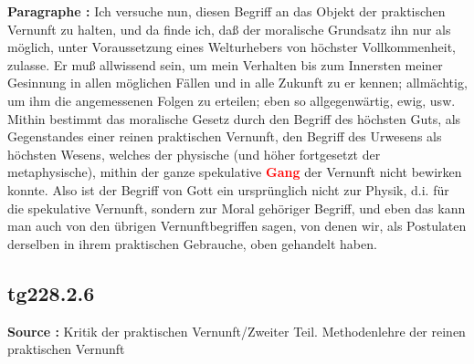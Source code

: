 \documentclass[a4paper,12pt,twoside]{book}
\newcommand{\match}[1]{\textcolor{red}{\textbf{#1}}}
\begin{document}
	\noindent\textbf{Paragraphe : }Ich versuche nun, diesen Begriff an das Objekt der praktischen Vernunft zu halten, und da finde ich, daß der moralische Grundsatz ihn nur als möglich, unter Voraussetzung eines Welturhebers von höchster Vollkommenheit, zulasse. Er muß allwissend sein, um mein Verhalten bis zum Innersten meiner Gesinnung in allen möglichen Fällen und in alle Zukunft zu er kennen; allmächtig, um ihm die angemessenen Folgen zu erteilen; eben so allgegenwärtig, ewig, usw. Mithin bestimmt das moralische Gesetz durch den Begriff des höchsten Guts, als Gegenstandes einer reinen praktischen Vernunft, den Begriff des Urwesens als höchsten Wesens, welches der physische (und höher fortgesetzt der metaphysische), mithin der ganze spekulative  \match{Gang} der Vernunft nicht bewirken konnte. Also ist der Begriff von Gott ein ursprünglich nicht zur Physik, d.i. für die spekulative Vernunft, sondern zur Moral gehöriger Begriff, und eben das kann man auch von den übrigen Vernunftbegriffen sagen, von denen wir, als Postulaten derselben in ihrem praktischen Gebrauche, oben gehandelt haben. 
	
	\subsection*{tg228.2.6} 
	\textbf{Source : }Kritik der praktischen Vernunft/Zweiter Teil. Methodenlehre der reinen praktischen Vernunft\\  
	
\end{document}
